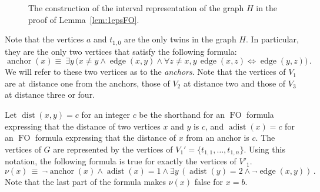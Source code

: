 \documentclass{CSML}
\def\prebox#1{\mathop{\mbox{#1}}}
\newcommand{\FO}{\ensuremath{\operatorname{FO}}\xspace}
\theoremstyle{plain}\newtheorem{claim}[thm]{Claim}
\begin{document}
\begin{figure}[tb]
\begin{center}
\end{center}
\caption{The construction of the interval representation of the graph $H$ in the proof of Lemma~\ref{lem:1epsFO}.}
\label{fig:dense1hardness}
\end{figure}

Note that the vertices $a$ and $t_{1,0}$ are the only twins in the graph $H$.
In particular, they are the only two vertices that satisfy the following formula:
$$
\prebox{anchor}(x)\equiv\>
 \exists y\, \big(x\not=y\wedge\prebox{edge}(x,y)\wedge \forall z\not=x,y\,
	\prebox{edge}(x,z)\Leftrightarrow\prebox{edge}(y,z)\big)
\,.$$
We will refer to these two vertices as to the {\em anchors}.
Note that the vertices of $V_1$ are at distance one from the anchors,
those of $V_2$ at distance two and
those of $V_3$ at distance three or four.

Let $\prebox{dist}(x,y)=c$ for an integer $c$ be the shorthand for an \FO formula expressing that the distance of two vertices $x$ and $y$ is $c$, and
$\prebox{adist}(x)=c$ for an \FO formula expressing that the distance of $x$ from an anchor is $c$.
The vertices of $G$ are represented by the vertices of $V_1'=\{t_{1,1},\dots,t_{1,n}\}$.
Using this notation, the following formula is true for exactly the vertices of $V'_1$.
$$
\nu(x)\,\equiv\> \neg\prebox{anchor}(x)
 \wedge\prebox{adist}(x)=1\wedge \exists y\,
	(\prebox{adist}(y)=2\wedge\neg\prebox{edge}(x,y))\,.
$$
Note that the last part of the formula makes $\nu(x)$ false for $x=b$.
\end{document}

